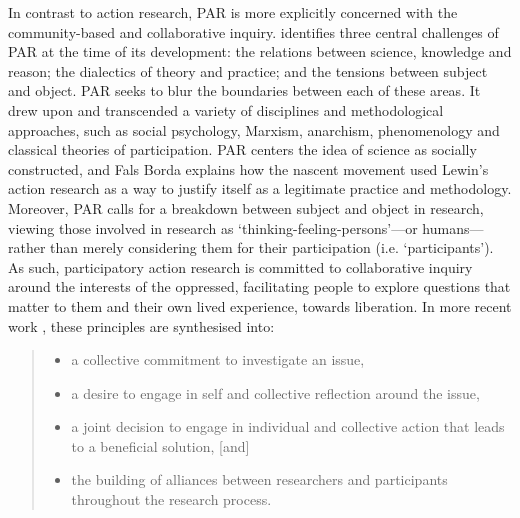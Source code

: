 In contrast to action research, PAR is more explicitly concerned with the community-based and collaborative inquiry. \citet{fals_borda_kinsey_2001} identifies three central challenges of PAR at the time of its development: the relations between science, knowledge and reason; the dialectics of theory and practice; and the tensions between subject and object. PAR seeks to blur the boundaries between each of these areas. It drew upon and transcended a variety of disciplines and methodological approaches, such as social psychology, Marxism, anarchism, phenomenology and classical theories of participation. PAR centers the idea of science as socially constructed, and Fals Borda explains how the nascent movement used Lewin’s action research as a way to justify itself as a legitimate practice and methodology. Moreover, PAR calls for a breakdown between subject and object in research, viewing those involved in research as ‘thinking-feeling-persons’—or humans—rather than merely considering them for their participation (i.e. ‘participants’). As such, participatory action research is committed to collaborative inquiry around the interests of the oppressed, facilitating people to explore questions that matter to them and their own lived experience, towards liberation. In more recent work \citep[p. 1]{mcintyre_participatory_2007}, these principles are synthesised into:
\begin{quote}
\begin{itemize}
    \item a collective commitment to investigate an issue,
    \item a desire to engage in self and collective reflection around the issue,
    \item a joint decision to engage in individual and collective action that leads to a beneficial solution, [and]
    \item the building of alliances between researchers and participants throughout the research process.
\end{itemize}
\end{quote}
